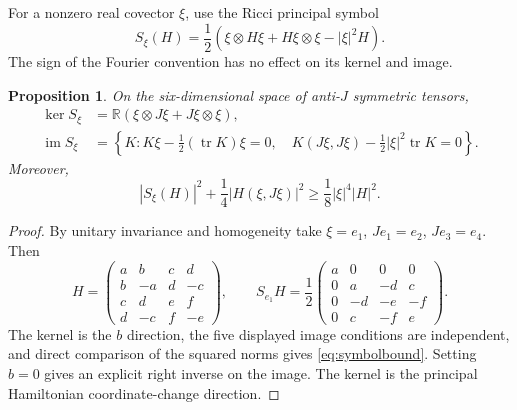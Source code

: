 \documentclass[11pt,a4paper]{article}
\newtheorem{proposition}[theorem]{Proposition}
\theoremstyle{definition}
\theoremstyle{remark}
\newcommand{\tr}{\operatorname{tr}}
\newcommand{\R}{\mathbb R}
\begin{document}
For a nonzero real covector $\xi$, use the Ricci principal symbol
\begin{equation}\label{eq:symbol}
 S_\xi(H)=\frac12\left(\xi\otimes H\xi+H\xi\otimes\xi-|\xi|^2H\right).
\end{equation}
The sign of the Fourier convention has no effect on its kernel and image.
\begin{proposition}\label{prop:symbol}
On the six-dimensional space of anti-$J$ symmetric tensors,
\begin{align*}
 \ker S_\xi&=\R(\xi\otimes J\xi+J\xi\otimes\xi),\\
 \operatorname{im}S_\xi&=\left\{K:K\xi-\tfrac12(\tr K)\xi=0,\quad
 K(J\xi,J\xi)-\tfrac12|\xi|^2\tr K=0\right\}.
\end{align*}
Moreover,
\begin{equation}\label{eq:symbolbound}
 |S_\xi(H)|^2+\frac14|H(\xi,J\xi)|^2\ge\frac18|\xi|^4|H|^2.
\end{equation}
\end{proposition}
\begin{proof}
By unitary invariance and homogeneity take $\xi=e_1$, $Je_1=e_2$, $Je_3=e_4$. Then
\[
 H=\begin{pmatrix}a&b&c&d\\b&-a&d&-c\\c&d&e&f\\d&-c&f&-e\end{pmatrix},\qquad
 S_{e_1}H=\frac12\begin{pmatrix}a&0&0&0\\0&a&-d&c\\0&-d&-e&-f\\0&c&-f&e\end{pmatrix}.
\]
The kernel is the $b$ direction, the five displayed image conditions are independent, and direct comparison of the squared norms gives \eqref{eq:symbolbound}. Setting $b=0$ gives an explicit right inverse on the image. The kernel is the principal Hamiltonian coordinate-change direction.
\end{proof}
\end{document}
